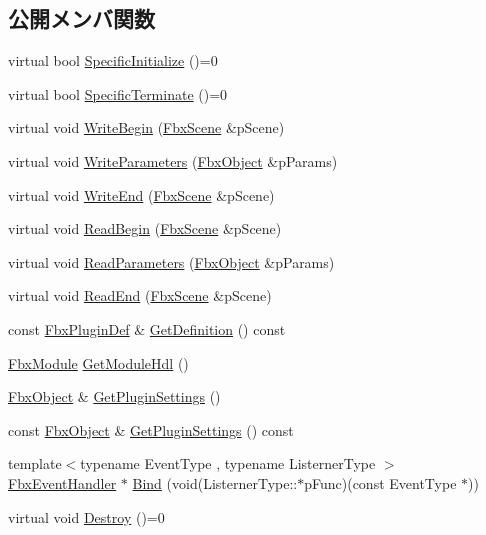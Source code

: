 \subsection*{公開メンバ関数}
\begin{DoxyCompactItemize}
\item 
virtual bool \hyperlink{class_fbx_plugin_a5b6ba0af2c0cf8a7d5cb1680407d9e7e}{Specific\+Initialize} ()=0
\item 
virtual bool \hyperlink{class_fbx_plugin_ade394d2752689a4690a29b34d347446e}{Specific\+Terminate} ()=0
\item 
virtual void \hyperlink{class_fbx_plugin_aff87a8ef5c8b6bae66cc10970b7827bf}{Write\+Begin} (\hyperlink{class_fbx_scene}{Fbx\+Scene} \&p\+Scene)
\item 
virtual void \hyperlink{class_fbx_plugin_af4b6ae438302c2153d582f1d6c87b636}{Write\+Parameters} (\hyperlink{class_fbx_object}{Fbx\+Object} \&p\+Params)
\item 
virtual void \hyperlink{class_fbx_plugin_a7c61fbd0c3d3a3d41f7208c2b28ce379}{Write\+End} (\hyperlink{class_fbx_scene}{Fbx\+Scene} \&p\+Scene)
\item 
virtual void \hyperlink{class_fbx_plugin_ac39bc91afc422603d99fea3c09700814}{Read\+Begin} (\hyperlink{class_fbx_scene}{Fbx\+Scene} \&p\+Scene)
\item 
virtual void \hyperlink{class_fbx_plugin_ab64d3a67a358e3b9466bc8f6d26e3be2}{Read\+Parameters} (\hyperlink{class_fbx_object}{Fbx\+Object} \&p\+Params)
\item 
virtual void \hyperlink{class_fbx_plugin_a89290eef23c5359db142e0ad1d8743e0}{Read\+End} (\hyperlink{class_fbx_scene}{Fbx\+Scene} \&p\+Scene)
\item 
const \hyperlink{struct_fbx_plugin_def}{Fbx\+Plugin\+Def} \& \hyperlink{class_fbx_plugin_a2827e6fbb16ac3c80a2e9a50c34201c5}{Get\+Definition} () const
\item 
\hyperlink{fbxmodule_8h_a1d2ed3e9ccb8075d585f7cb7bdf40420}{Fbx\+Module} \hyperlink{class_fbx_plugin_ae50021560acfbc6a4d924cae16d5414b}{Get\+Module\+Hdl} ()
\item 
\hyperlink{class_fbx_object}{Fbx\+Object} \& \hyperlink{class_fbx_plugin_aae9cc7178878f2350538b74e183f46cb}{Get\+Plugin\+Settings} ()
\item 
const \hyperlink{class_fbx_object}{Fbx\+Object} \& \hyperlink{class_fbx_plugin_a3f5e6d9e20e306ceee8f163bbf59fe58}{Get\+Plugin\+Settings} () const
\item 
{\footnotesize template$<$typename Event\+Type , typename Listerner\+Type $>$ }\\\hyperlink{class_fbx_event_handler}{Fbx\+Event\+Handler} $\ast$ \hyperlink{class_fbx_plugin_aafd653e6999de489d8e1c00fa9956ed0}{Bind} (void(Listerner\+Type\+::$\ast$p\+Func)(const Event\+Type $\ast$))
\item 
virtual void \hyperlink{class_fbx_plugin_a0a3b33c932cc862e539cef85d168b86a}{Destroy} ()=0
\end{DoxyCompactItemize}
